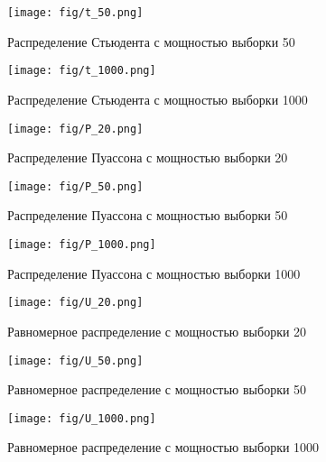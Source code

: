     \begin{figure}
        \centering
        \texttt{[image: fig/t\_50.png]}
        \caption{Распределение Стьюдента с мощностью выборки 50}
        \label{fig:enter-label}
    \end{figure}

    \begin{figure}
        \centering
        \texttt{[image: fig/t\_1000.png]}
        \caption{Распределение Стьюдента с мощностью выборки 1000}
        \label{fig:enter-label}
    \end{figure}

    \begin{figure}
        \centering
        \texttt{[image: fig/P\_20.png]}
        \caption{Распределение Пуассона с мощностью выборки 20}
        \label{fig:enter-label}
    \end{figure}

    \begin{figure}
        \centering
        \texttt{[image: fig/P\_50.png]}
        \caption{Распределение Пуассона с мощностью выборки 50}
        \label{fig:enter-label}
    \end{figure}

    \begin{figure}
        \centering
        \texttt{[image: fig/P\_1000.png]}
        \caption{Распределение Пуассона с мощностью выборки 1000}
        \label{fig:enter-label}
    \end{figure}

    \begin{figure}
        \centering
        \texttt{[image: fig/U\_20.png]}
        \caption{Равномерное распределение с мощностью выборки 20}
        \label{fig:enter-label}
    \end{figure}

    \begin{figure}
        \centering
        \texttt{[image: fig/U\_50.png]}
        \caption{Равномерное распределение с мощностью выборки 50}
        \label{fig:enter-label}
    \end{figure}

    \begin{figure}
        \centering
        \texttt{[image: fig/U\_1000.png]}
        \caption{Равномерное распределение с мощностью выборки 1000}
        \label{fig:enter-label}
    \end{figure}

